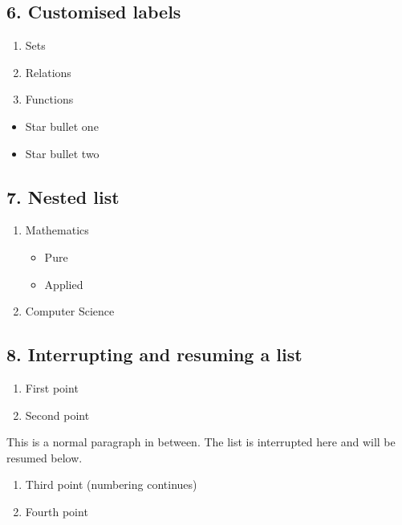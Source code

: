 \documentclass[12pt]{article}
\begin{document}
\subsection*{6. Customised labels}
\begin{enumerate}[label=(\alph*)]
  \item Sets
  \item Relations
  \item Functions
\end{enumerate}

\begin{itemize}[label=$\star$]
  \item Star bullet one
  \item Star bullet two
\end{itemize}

\subsection*{7. Nested list}
\begin{enumerate}
  \item Mathematics
    \begin{itemize}
      \item Pure
      \item Applied
    \end{itemize}
  \item Computer Science
\end{enumerate}

\subsection*{8. Interrupting and resuming a list}
\begin{enumerate}
  \item First point
  \item Second point
\end{enumerate}
This is a normal paragraph in between. The list is interrupted here and will be resumed below.
\begin{enumerate}[resume]
  \item Third point (numbering continues)
  \item Fourth point
\end{enumerate}
\end{document}
